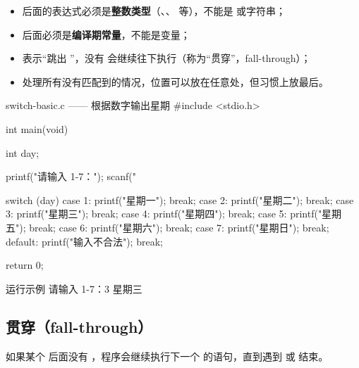 \begin{center}
\end{center}

\begin{itemize}
  \item {} 后面的表达式必须是\textbf{整数类型}（、、 等），不能是  或字符串；
  \item {} 后面必须是\textbf{编译期常量}，不能是变量；
  \item {} 表示“跳出 ”，没有  会继续往下执行（称为“贯穿”，fall-through）；
  \item {} 处理所有没有匹配到的情况，位置可以放在任意处，但习惯上放最后。
\end{itemize}

\begin{codebox}{switch-basic.c —— 根据数字输出星期}
#include <stdio.h>

int main(void)
{
    int day;

    printf("请输入 1-7：");
    scanf("%

    switch (day) {
    case 1:
        printf("星期一\n");
        break;
    case 2:
        printf("星期二\n");
        break;
    case 3:
        printf("星期三\n");
        break;
    case 4:
        printf("星期四\n");
        break;
    case 5:
        printf("星期五\n");
        break;
    case 6:
        printf("星期六\n");
        break;
    case 7:
        printf("星期日\n");
        break;
    default:
        printf("输入不合法\n");
        break;
    }

    return 0;
}
\end{codebox}

\begin{outbox}{运行示例}
请输入 1-7：3
星期三
\end{outbox}

\subsection{贯穿（fall-through）}

如果某个  后面没有 ，程序会继续执行下一个  的语句，直到遇到  或  结束。

